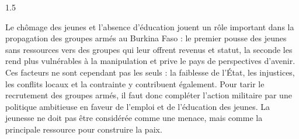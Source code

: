 \documentclass[12pt]{article}
\begin{document}
\begin{spacing}{1.5}

Le chômage des jeunes et l'absence d'éducation jouent un rôle important dans la propagation des groupes armés au Burkina Faso : le premier pousse des jeunes sans ressources vers des groupes qui leur offrent revenus et statut, la seconde les rend plus vulnérables à la manipulation et prive le pays de perspectives d'avenir. Ces facteurs ne sont cependant pas les seuls : la faiblesse de l'État, les injustices, les conflits locaux et la contrainte y contribuent également. Pour tarir le recrutement des groupes armés, il faut donc compléter l'action militaire par une politique ambitieuse en faveur de l'emploi et de l'éducation des jeunes. La jeunesse ne doit pas être considérée comme une menace, mais comme la principale ressource pour construire la paix.

\end{spacing}
\end{document}
